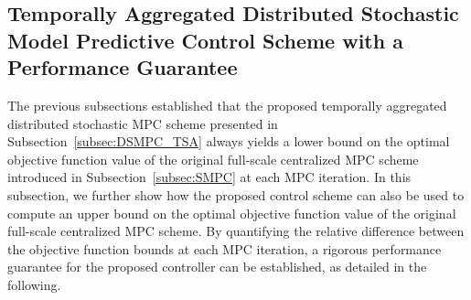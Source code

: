 \documentclass[a4paper,fleqn]{cas-sc}
\begin{document}
\subsection{Temporally Aggregated Distributed Stochastic Model Predictive Control Scheme with a Performance Guarantee}
\label{subsec:obj_fun_bounds}

The previous subsections established that the proposed temporally aggregated distributed stochastic MPC scheme presented in Subsection~\ref{subsec:DSMPC_TSA}
always yields a lower bound on the optimal objective function value of the original full-scale centralized MPC scheme introduced in Subsection~\ref{subsec:SMPC} at each MPC iteration. 
In this subsection, we further show how the proposed control scheme can also be used to compute an upper bound on the optimal objective function value of the original full-scale centralized MPC scheme.
By quantifying the relative difference between the objective function bounds at each MPC iteration, a rigorous performance guarantee for the proposed controller can be established, as detailed in the following.
\end{document}
